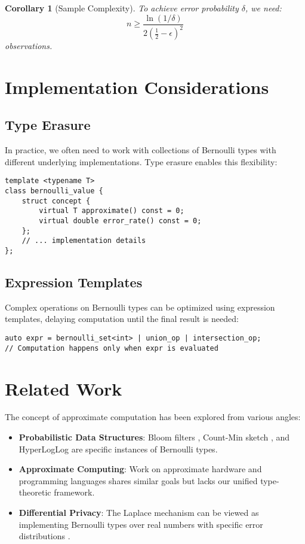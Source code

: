\documentclass[11pt,final,hidelinks]{article}
\newtheorem{corollary}[theorem]{Corollary}
\begin{document}
\begin{corollary}[Sample Complexity]
To achieve error probability $\delta$, we need:
\begin{equation}
n \geq \frac{\ln(1/\delta)}{2(\frac{1}{2} - \epsilon)^2}
\end{equation}
observations.
\end{corollary}

\section{Implementation Considerations}

\subsection{Type Erasure}

In practice, we often need to work with collections of Bernoulli types with different underlying implementations. Type erasure enables this flexibility:

\begin{verbatim}
template <typename T>
class bernoulli_value {
    struct concept { 
        virtual T approximate() const = 0;
        virtual double error_rate() const = 0;
    };
    // ... implementation details
};
\end{verbatim}

\subsection{Expression Templates}

Complex operations on Bernoulli types can be optimized using expression templates, delaying computation until the final result is needed:

\begin{verbatim}
auto expr = bernoulli_set<int> | union_op | intersection_op;
// Computation happens only when expr is evaluated
\end{verbatim}

\section{Related Work}

The concept of approximate computation has been explored from various angles:
\begin{itemize}
    \item \textbf{Probabilistic Data Structures}: Bloom filters \cite{bloom1970}, Count-Min sketch \cite{cormode2005}, and HyperLogLog \cite{flajolet2007} are specific instances of Bernoulli types.
    \item \textbf{Approximate Computing}: Work on approximate hardware \cite{han2013} and programming languages \cite{sampson2011} shares similar goals but lacks our unified type-theoretic framework.
    \item \textbf{Differential Privacy}: The Laplace mechanism can be viewed as implementing Bernoulli types over real numbers with specific error distributions \cite{dwork2006}.
\end{itemize}
\end{document}
